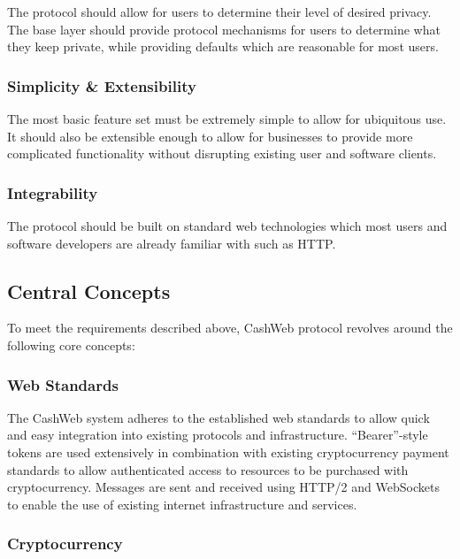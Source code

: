 \documentclass{article}
\begin{document}
The protocol should allow for users to determine their level of desired privacy. The base layer should provide protocol mechanisms for users to determine what they keep private, while providing defaults which are reasonable for most users.

\subsubsection{Simplicity \& Extensibility}

The most basic feature set must be extremely simple to allow for ubiquitous use. It should also be extensible enough to allow for businesses to provide more complicated functionality without disrupting existing user and software clients.

\subsubsection{Integrability}

The protocol should be built on standard web technologies which most users and software developers are already familiar with such as HTTP.

\subsection{Central Concepts} %

To meet the requirements described above, CashWeb protocol revolves around the following core concepts:

\subsubsection{Web Standards}

The CashWeb system adheres to the established web standards to allow quick and easy integration into existing protocols and infrastructure. ``Bearer''-style tokens are used extensively in combination with existing cryptocurrency payment standards to allow authenticated access to resources to be purchased with cryptocurrency. Messages are sent and received using HTTP/2\supercite{rfc7540} and WebSockets\supercite{rfc6455} to enable the use of existing internet infrastructure and services.

\subsubsection{Cryptocurrency}
\end{document}
